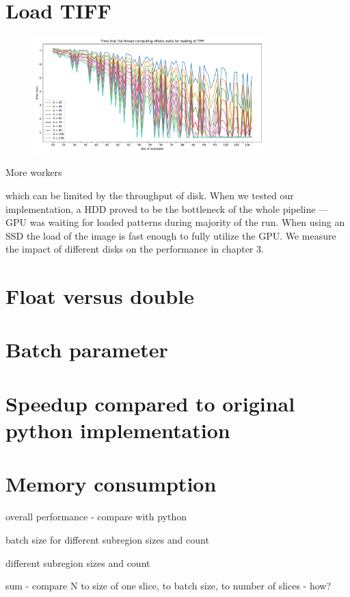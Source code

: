 \section{Load TIFF}

\begin{figure}[h]
	\centering
	\includegraphics[width=0.8\textwidth]{img/eval/load-plot}
	\caption{}
	\label{load-wait}
\end{figure}

More workers



which can be limited by the throughput of disk. When we tested our implementation, a HDD proved to be the bottleneck of the whole pipeline --- GPU was waiting for loaded patterns during majority of the run. When using an SSD the load of the image is fast enough to fully utilize the GPU. We measure the impact of different disks on the performance in chapter 3.

\section{Float versus double}


\section{Batch parameter}
\label{batch-param-eval}


\section{Speedup compared to original python implementation}


\section{Memory consumption}


overall performance - compare with python

batch size for different subregion sizes and count

different subregion sizes and count

sum - compare N to size of one slice, to batch size, to number of slices - how?